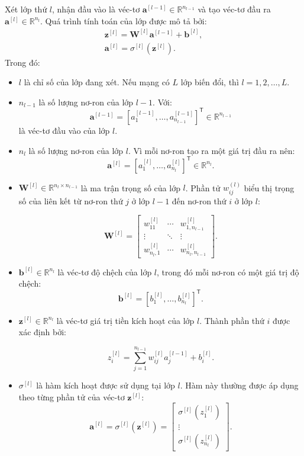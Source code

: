 Xét lớp thứ $l$, nhận đầu vào là véc-tơ $\mathbf{a}^{[l-1]}\in\mathbb{R}^{n_{l-1}}$ và tạo véc-tơ đầu ra $\mathbf{a}^{[l]}\in\mathbb{R}^{n_l}.$ Quá trình tính toán của lớp được mô tả bởi:
\begin{align*}
    \mathbf{z}^{[l]} = 
    \mathbf{W}^{[l]}\mathbf{a}^{[l-1]}+\mathbf{b}^{[l]},
    \\
    \mathbf{a}^{[l]} = \sigma^{[l]}\left(\mathbf{z}^{[l]}\right).
\end{align*}
Trong đó:
\begin{itemize}
\item \(l\) là chỉ số của lớp đang xét. Nếu mạng có \(L\) lớp biến đổi, thì \(l=1,2,\ldots,L\).

\item \(n_{l-1}\) là số lượng nơ-ron của lớp \(l-1\). Với:
\[\mathbf{a}^{[l-1]}
= [a_1^{[l-1]},\ldots,a_{n_{l-1}}^{[l-1]}]^{\mathsf T}
\in\mathbb{R}^{n_{l-1}}\]
là véc-tơ đầu vào của lớp \(l\).

\item \(n_l\) là số lượng nơ-ron của lớp \(l\). Vì mỗi nơ-ron tạo ra một giá trị đầu ra nên:
\[\mathbf{a}^{[l]}=[a_1^{[l]},\ldots,a_{n_l}^{[l]}]^{\mathsf T}
\in\mathbb{R}^{n_l}.\]

\item \(\mathbf{W}^{[l]}\in\mathbb{R}^{n_l\times n_{l-1}}\) là ma trận trọng số của lớp \(l\). Phần tử \(w_{ij}^{(l)}\) biểu thị trọng số của liên kết từ nơ-ron thứ \(j\) ở lớp \(l-1\) đến nơ-ron thứ \(i\) ở lớp \(l\):

\[\mathbf{W}^{[l]}
=\begin{bmatrix}
w_{11}^{[l]} & \cdots & w_{1,n_{l-1}}^{[l]}\\
\vdots & \ddots & \vdots\\
w_{n_l,1}^{[l]} & \cdots & w_{n_l,n_{l-1}}^{[l]}
\end{bmatrix}.\]

\item \(\mathbf{b}^{[l]}\in\mathbb{R}^{n_l}\) là véc-tơ độ chệch của lớp \(l\), trong đó mỗi nơ-ron có một giá trị độ chệch:
\[\mathbf{b}^{[l]}=[b_1^{[l]},\ldots,b_{n_l}^{[l]}]^{\mathsf T}.\]

\item \(\mathbf{z}^{[l]}\in\mathbb{R}^{n_l}\) là véc-tơ giá trị tiền kích hoạt của lớp \(l\). Thành phần thứ \(i\) được xác định bởi:

\[z_i^{[l]} =\sum_{j=1}^{n_{l-1}}w_{ij}^{[l]}a_j^{[l-1]}+b_i^{[l]}.\]

\item \(\sigma^{[l]}\) là hàm kích hoạt được sử dụng tại lớp \(l\). Hàm này thường được áp dụng theo từng phần tử của véc-tơ \(\mathbf{z}^{[l]}\):
\[\mathbf{a}^{[l]}=
\sigma^{[l]}(\mathbf{z}^{[l]})=
\begin{bmatrix}
\sigma^{[l]}(z_1^{[l]})\\
\vdots\\
\sigma^{[l]}(z_{n_l}^{[l]})
\end{bmatrix}.\]
\end{itemize}

